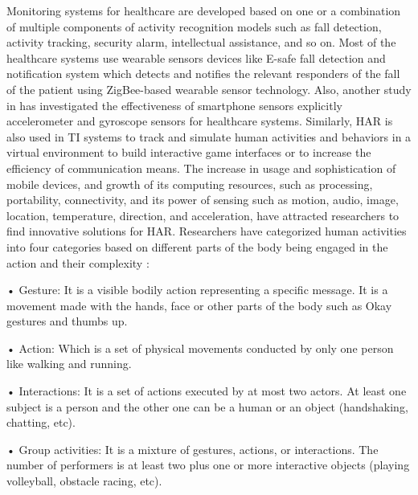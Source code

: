 \documentclass[12pt,conference]{IEEEtran}
\begin{document}
Monitoring systems for healthcare are developed based on one or a combination of multiple components of activity recognition models such as fall detection, activity tracking, security alarm, intellectual assistance, and so on. Most of the healthcare systems use wearable sensors devices like E-safe fall detection and notification system \cite{12gannapathy2013zigbee} which detects and notifies the relevant responders of the fall of the patient using ZigBee-based wearable sensor technology. Also, another study in \cite{13ogbuabor2018human} has investigated the effectiveness of smartphone sensors explicitly accelerometer and gyroscope sensors for healthcare systems. Similarly, HAR is also used in TI systems to track and simulate human activities and behaviors in a virtual environment to build interactive game interfaces or to increase the efficiency of communication means.
The increase in usage and sophistication of mobile devices, and growth of its computing resources, such as processing, portability, connectivity, and its power of sensing such as motion, audio, image, location, temperature, direction, and acceleration, have attracted researchers to find innovative solutions for HAR.
Researchers have categorized human activities into four categories based on different parts of the body being engaged in the action and their complexity \cite{14aggarwal2011human}: \newline

•	Gesture: It is a visible bodily action representing a specific message. It is a movement made with the hands, face or other parts of the body such as Okay gestures and thumbs up. \newline

•	Action: Which is a set of physical movements conducted by only one person like walking and running. \newline

•	Interactions: It is a set of actions executed by at most two actors. At least one subject is a person and the other one can be a human or an object (handshaking, chatting, etc). \newline

•   Group activities: It is a mixture of gestures, actions, or interactions. The number of performers is at least two plus one or more interactive objects (playing volleyball, obstacle racing, etc). \newline
\end{document}
